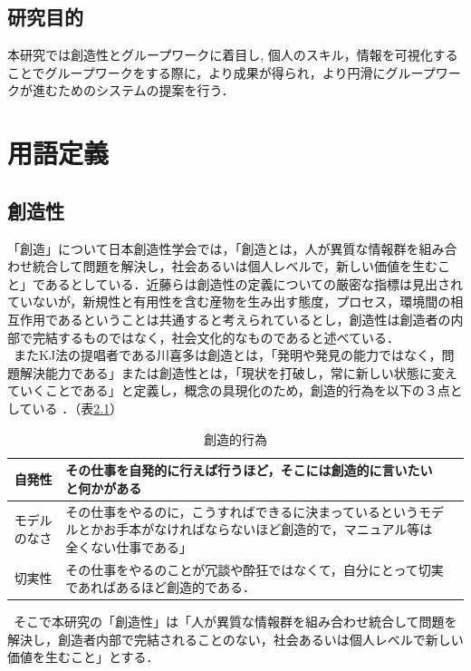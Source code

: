 \documentclass{funthesis}
\begin{document}
\section{研究目的}
本研究では創造性とグループワークに着目し,  個人のスキル，情報を可視化することでグループワークをする際に，より成果が得られ，より円滑にグループワークが進むためのシステムの提案を行う．
\chapter{用語定義}
\section{創造性}
「創造」について日本創造性学会では，「創造とは，人が異質な情報群を組み合わせ統合して問題を解決し，社会あるいは個人レベルで，新しい価値を生むこと」であるとしている\cite{A12}．近藤ら\cite{A13}は創造性の定義についての厳密な指標は見出されていないが，新規性と有用性を含む産物を生み出す態度，プロセス，環境間の相互作用であるということは共通すると考えられているとし，創造性は創造者の内部で完結するものではなく，社会文化的なものであると述べている．\\
\ またKJ法の提唱者である川喜多は創造とは，「発明や発見の能力ではなく，問題解決能力である」または創造性とは，「現状を打破し，常に新しい状態に変えていくことである」と定義し，概念の具現化のため，創造的行為を以下の３点としている\cite{A14} \cite{A15}．（表\ref{souzousei}）

\begin{table}[H]
\begin{center}
 \caption{創造的行為}
  \begin{tabular}{|c|p{105mm}|p{10mm}|} \hline
    自発性& その仕事を自発的に行えば行うほど，そこには創造的に言いたいと何かがある\tabularnewline \hline
    モデルのなさ& その仕事をやるのに，こうすればできるに決まっているというモデルとかお手本がなければならないほど創造的で，マニュアル等は全くない仕事である」 \tabularnewline \hline
    切実性&その仕事をやるのことが冗談や酔狂ではなくて，自分にとって切実であればあるほど創造的である．\tabularnewline
    \hline
  \end{tabular}

  \label{souzousei}
  \end{center}
\end{table}


\ そこで本研究の「創造性」は「人が異質な情報群を組み合わせ統合して問題を解決し，創造者内部で完結されることのない，社会あるいは個人レベルで新しい価値を生むこと」とする．
\end{document}
